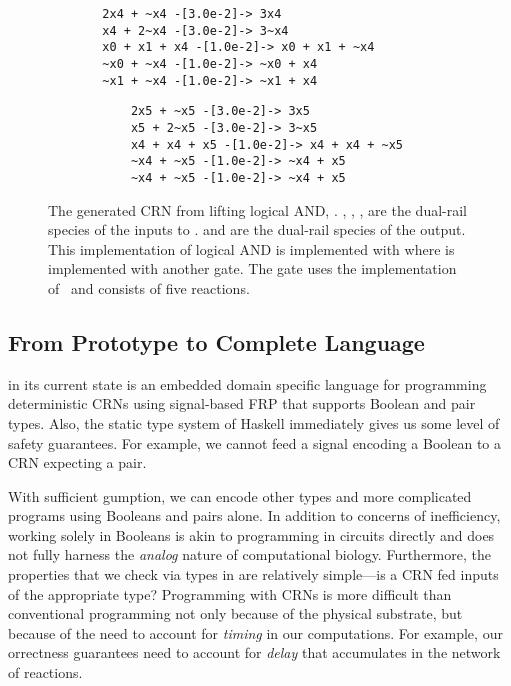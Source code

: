 \begin{figure}
    \begin{subfigure}[t]{0.48\textwidth}
        \begin{minipage}[t][1in][b]{0.48\textwidth}
            \begin{BVerbatim}
  2x4 + ~x4 -[3.0e-2]-> 3x4
  x4 + 2~x4 -[3.0e-2]-> 3~x4
  x0 + x1 + x4 -[1.0e-2]-> x0 + x1 + ~x4
  ~x0 + ~x4 -[1.0e-2]-> ~x0 + x4
  ~x1 + ~x4 -[1.0e-2]-> ~x1 + x4
            \end{BVerbatim}
        \end{minipage}
    \end{subfigure}
    \begin{subfigure}[t]{0.48\textwidth}
        \begin{minipage}[t][1in][b]{0.48\textwidth}
            \begin{BVerbatim}
      2x5 + ~x5 -[3.0e-2]-> 3x5
      x5 + 2~x5 -[3.0e-2]-> 3~x5
      x4 + x4 + x5 -[1.0e-2]-> x4 + x4 + ~x5
      ~x4 + ~x5 -[1.0e-2]-> ~x4 + x5
      ~x4 + ~x5 -[1.0e-2]-> ~x4 + x5
            \end{BVerbatim}
        \end{minipage}
    \end{subfigure}
\caption{The generated CRN from lifting logical AND, .
  , , ,  are the dual-rail species of the inputs to \hask{(&&)}.
   and  are the dual-rail species of the output.
  This implementation of logical AND is implemented with  where  is implemented with another  gate.
  The  gate uses the implementation of~\cite{rdc} and consists of five reactions.
  }
\label{fig:and-crn}
\end{figure}

\subsection{From Prototype to Complete Language}
\reactamole{} in its current state is an embedded domain specific language for programming deterministic CRNs using signal-based FRP that supports Boolean and pair types.
Also, the static type system of Haskell immediately gives us some level of safety guarantees.
For example, we cannot feed a signal encoding a Boolean to a CRN expecting a pair.

With sufficient gumption, we can encode other types and more complicated programs using Booleans and pairs alone.
In addition to concerns of inefficiency, working solely in Booleans is akin to programming in circuits directly and does not fully harness the \emph{analog} nature of computational biology.
Furthermore, the properties that we check via types in \reactamole{} are relatively simple---is a CRN fed inputs of the appropriate type?
Programming with CRNs is more difficult than conventional programming not only because of the physical substrate, but because of the need to account for \emph{timing} in our computations.
For example, our orrectness guarantees need to account for \emph{delay} that accumulates in the network of reactions.


